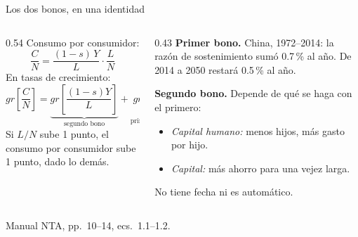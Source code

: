 \documentclass[aspectratio=169,11pt]{beamer}
\newcommand{\fuente}[1]{\par\vfill{\small\color{cGris}#1\par}}
\begin{document}
\begin{frame}{Los dos bonos, en una identidad}
  \begin{columns}[T]
    \begin{column}{0.54\textwidth}
      Consumo por consumidor:
      \[
        \frac{C}{N}=\frac{(1-s)\,Y}{L}\cdot\frac{L}{N}
      \]
      \pause
      En tasas de crecimiento:
      \[
        gr\!\left[\frac{C}{N}\right]=
        \underbrace{gr\!\left[\frac{(1-s)Y}{L}\right]}_{\text{segundo bono}}+
        \underbrace{gr\!\left[\frac{L}{N}\right]}_{\text{primer bono}}
      \]
      \pause
      {\small Si $L/N$ sube 1 punto, el consumo por consumidor sube 1 punto, dado lo demás.}
    \end{column}
    \begin{column}{0.43\textwidth}
      \pause
      \textbf{Primer bono.} China, 1972--2014: la razón de sostenimiento sumó 0.7\,\% al año. De 2014 a 2050 restará 0.5\,\% al año.
      \par\medskip
      \pause
      \textbf{Segundo bono.} Depende de qué se haga con el primero:
      \begin{itemize}
        \item \emph{Capital humano:} menos hijos, más gasto por hijo.
        \item \emph{Capital:} más ahorro para una vejez larga.
      \end{itemize}
      \par\smallskip
      No tiene fecha ni es automático.
    \end{column}
  \end{columns}
  \fuente{Manual NTA, pp.~10--14, ecs.~1.1--1.2.}
\end{frame}
\end{document}
